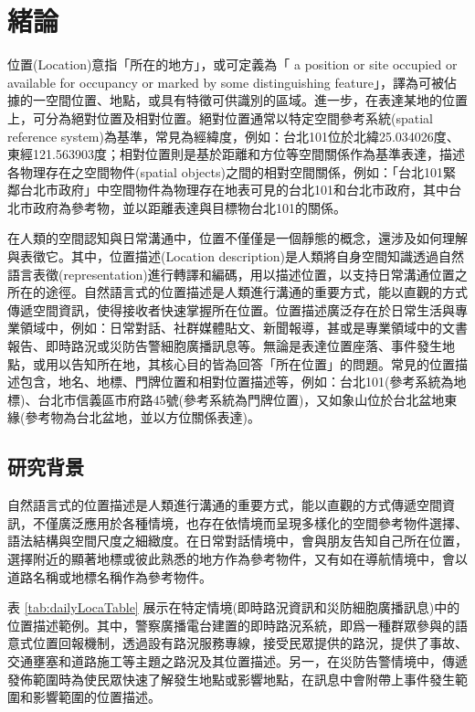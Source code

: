 
\chapter{緒論}

位置(Location)意指「所在的地方」\parencite{RN171}，或可定義為「 a position or site occupied or available for occupancy or marked by some distinguishing feature」\parencite{RN172}，譯為可被佔據的一空間位置、地點，或具有特徵可供識別的區域。進一步，在表達某地的位置上，可分為絕對位置及相對位置\parencite{RN171}。絕對位置通常以特定空間參考系統(spatial reference system)為基準，常見為經緯度，例如：台北101位於北緯25.034026度、東經121.563903度\parencite{RN174}；相對位置則是基於距離和方位等空間關係作為基準表達，描述各物理存在之空間物件(spatial objects)之間的相對空間關係，例如：「台北101緊鄰台北市政府」中空間物件為物理存在地表可見的台北101和台北市政府，其中台北市政府為參考物，並以距離表達與目標物台北101的關係。

在人類的空間認知與日常溝通中，位置不僅僅是一個靜態的概念，還涉及如何理解與表徵它。其中，位置描述(Location description)是人類將自身空間知識透過自然語言表徵(representation)進行轉譯和編碼，用以描述位置，以支持日常溝通位置之所在的途徑\parencite{RN23, RN93, RN126, RN128}。自然語言式的位置描述是人類進行溝通的重要方式，能以直觀的方式傳遞空間資訊，使得接收者快速掌握所在位置。位置描述廣泛存在於日常生活與專業領域中，例如：日常對話、社群媒體貼文、新聞報導，甚或是專業領域中的文書報告、即時路況或災防告警細胞廣播訊息等。無論是表達位置座落、事件發生地點，或用以告知所在地，其核心目的皆為回答「所在位置」的問題。常見的位置描述包含，地名、地標、門牌位置和相對位置描述等，例如：台北101(參考系統為地標)、台北市信義區市府路45號(參考系統為門牌位置)，又如象山位於台北盆地東緣(參考物為台北盆地，並以方位關係表達)。

\section{研究背景}

自然語言式的位置描述是人類進行溝通的重要方式，能以直觀的方式傳遞空間資訊，不僅廣泛應用於各種情境，也存在依情境而呈現多樣化的空間參考物件選擇、語法結構與空間尺度之細緻度。在日常對話情境中，會與朋友告知自己所在位置，選擇附近的顯著地標或彼此熟悉的地方作為參考物件，又有如在導航情境中，會以道路名稱或地標名稱作為參考物件。

表 \ref{tab:dailyLocaTable} 展示在特定情境(即時路況資訊和災防細胞廣播訊息)中的位置描述範例。其中，警察廣播電台建置的即時路況系統，即爲一種群眾參與的語意式位置回報機制，透過設有路況服務專線，接受民眾提供的路況，提供了事故、交通壅塞和道路施工等主題之路況及其位置描述\parencite{RN89}。另一，在災防告警情境中，傳遞發佈範圍時為使民眾快速了解發生地點或影響地點，在訊息中會附帶上事件發生範圍和影響範圍的位置描述\parencite{RN13}。

